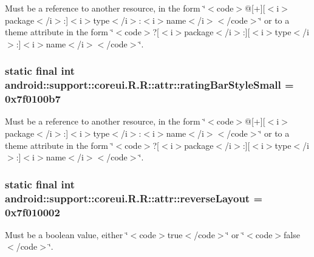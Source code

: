 Must be a reference to another resource, in the form \char`\"{}$<$code$>$@\mbox{[}+\mbox{]}\mbox{[}$<$i$>$package$<$/i$>$:\mbox{]}$<$i$>$type$<$/i$>$:$<$i$>$name$<$/i$>$$<$/code$>$\char`\"{} or to a theme attribute in the form \char`\"{}$<$code$>$?\mbox{[}$<$i$>$package$<$/i$>$:\mbox{]}\mbox{[}$<$i$>$type$<$/i$>$:\mbox{]}$<$i$>$name$<$/i$>$$<$/code$>$\char`\"{}. \hypertarget{classandroid_1_1support_1_1coreui_1_1_r_1_1attr_7410711296321c6301dcf73a6bd5c777}{
\subsubsection[{ratingBarStyleSmall}]{\setlength{\rightskip}{0pt plus 5cm}static final int android::support::coreui.R.R::attr::ratingBarStyleSmall = 0x7f0100b7}}
\label{classandroid_1_1support_1_1coreui_1_1_r_1_1attr_7410711296321c6301dcf73a6bd5c777}


Must be a reference to another resource, in the form \char`\"{}$<$code$>$@\mbox{[}+\mbox{]}\mbox{[}$<$i$>$package$<$/i$>$:\mbox{]}$<$i$>$type$<$/i$>$:$<$i$>$name$<$/i$>$$<$/code$>$\char`\"{} or to a theme attribute in the form \char`\"{}$<$code$>$?\mbox{[}$<$i$>$package$<$/i$>$:\mbox{]}\mbox{[}$<$i$>$type$<$/i$>$:\mbox{]}$<$i$>$name$<$/i$>$$<$/code$>$\char`\"{}. \hypertarget{classandroid_1_1support_1_1coreui_1_1_r_1_1attr_6c0ff0840864d320080af6c853b911da}{
\subsubsection[{reverseLayout}]{\setlength{\rightskip}{0pt plus 5cm}static final int android::support::coreui.R.R::attr::reverseLayout = 0x7f010002}}
\label{classandroid_1_1support_1_1coreui_1_1_r_1_1attr_6c0ff0840864d320080af6c853b911da}


Must be a boolean value, either \char`\"{}$<$code$>$true$<$/code$>$\char`\"{} or \char`\"{}$<$code$>$false$<$/code$>$\char`\"{}. 

